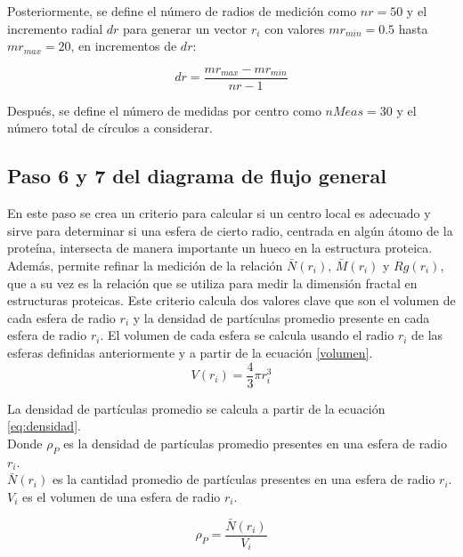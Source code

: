  	Posteriormente, se define el número de radios de medición como \(nr = 50\) y el incremento radial \(dr\) 
 	para  generar un vector \(r_i\) con valores \(mr_{min}= 0.5\) hasta \(mr_{max} = 20\), en incrementos de \(dr\):
 
 	\begin{equation}
 		 	dr = \frac{mr_{max} - mr_{min}}{nr - 1}
 	\end{equation}
	
	 Después, se define el n\'{u}mero de medidas por centro como \(nMeas = 30\) y el n\'{u}mero total 
	 de c\'{i}rculos a considerar.
	 
	 
	 \subsection{Paso 6 y 7 del diagrama de flujo general}
	 
	 
	 En este paso se crea un criterio para calcular si un centro local es adecuado y sirve para determinar si una esfera de cierto radio, centrada en alg\'{u}n \'{a}tomo de la prote\'{i}na, intersecta de manera importante un hueco en la estructura proteica. Además, permite refinar la medici\'{o}n de la relaci\'{o}n \( \bar{N}(r_i) \), \( \bar{M}(r_i)\) y \({Rg}(r_i)\), que a su vez es la relaci\'{o}n que se utiliza para medir la dimensión fractal en estructuras proteicas. Este criterio calcula dos valores clave que son el volumen de cada esfera de radio \(r_i\) y la densidad de partículas promedio presente en cada esfera de radio \(r_i\). El volumen de cada esfera se calcula usando el radio \(r_i\) de las esferas definidas anteriormente y a partir de la ecuaci\'{o}n \ref{volumen}.\\
	 
	 \begin{equation}
	 	V(r_i) = \frac{4}{3} \pi r_{i}^{3}
	 	\label{volumen}
	 \end{equation}
	 
	 La densidad de part\'{i}culas promedio se calcula a partir de la ecuaci\'{o}n \ref{eq:densidad}. \\
	 Donde \(\rho_{P}\) es la densidad de part\'{i}culas promedio presentes en una esfera de radio \(r_i\).\\
	 \(\bar N(r_{i})\) es la cantidad promedio de part\'{i}culas presentes en una esfera de radio \(r_i\).
	 \(V_{i}\) es el volumen de una esfera de radio \(r_{i}\).
	 
	 \begin{equation}
	 	\rho_P = \frac{\bar N(r_{i})}{V_{i}}
	 	\label{eq:densidad}
	 \end{equation}
	 
